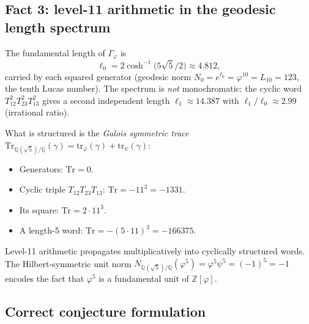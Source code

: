 \documentclass[11pt,a4paper]{article}
\theoremstyle{plain}
\theoremstyle{definition}
\theoremstyle{remark}
\numberwithin{equation}{section}
\providecommand{\Zp}{\ensuremath{\mathbb{Z}[\varphi]}}
\providecommand{\Qp}{\ensuremath{\mathbb{Q}(\sqrt{5})}}
\providecommand{\Gphi}{\ensuremath{\Gamma_{\varphi}}}
\providecommand{\vp}{\varphi}
\begin{document}
\subsection*{Fact 3: level-11 arithmetic in the geodesic length spectrum}

The fundamental length of $\Gphi$ is
\begin{equation}\label{eq:l0}
  \ell_{0} = 2\cosh^{-1}\!\bigl(5\sqrt{5}/2\bigr)\approx 4.812,
\end{equation}
carried by each squared generator (geodesic norm $N_0=e^{\ell_0}=\varphi^{10}=L_{10}=123$,
the tenth Lucas number).  The spectrum is \emph{not} monochromatic: the cyclic word
$T_{12}^{2}T_{23}^{2}T_{13}^{2}$ gives a second independent length $\ell_1\approx 14.387$
with $\ell_1/\ell_0\approx 2.99$ (irrational ratio).

What is structured is the \emph{Galois symmetric trace}
$\mathrm{Tr}_{\Qp/\mathbb{Q}}(\gamma)=\mathrm{tr}_\varphi(\gamma)+\mathrm{tr}_\psi(\gamma)$:
\begin{itemize}
\item Generators: $\mathrm{Tr}=0$.
\item Cyclic triple $T_{12}T_{23}T_{13}$: $\mathrm{Tr}=-11^{3}=-1331$.
\item Its square: $\mathrm{Tr}=2\cdot11^{3}$.
\item A length-5 word: $\mathrm{Tr}=-(5\cdot11)^{3}=-166375$.
\end{itemize}
Level-11 arithmetic propagates multiplicatively into cyclically structured words.
The Hilbert-symmetric unit norm $N_{\Qp/\mathbb Q}(\varphi^5)=\varphi^5\psi^5=(-1)^5=-1$
encodes the fact that $\vp^5$ is a fundamental unit of $\Zp$.

\subsection*{Correct conjecture formulation}
\end{document}
